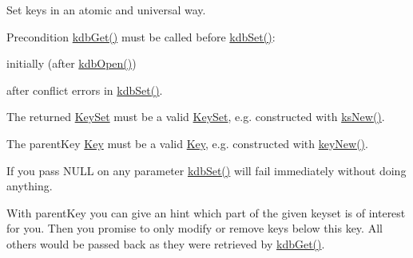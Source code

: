 Set keys in an atomic and universal way. \begin{DoxyPrecond}{Precondition}
\mbox{\hyperlink{group__kdb_ga28e385fd9cb7ccfe0b2f1ed2f62453a1}{kdb\+Get()}} must be called before \mbox{\hyperlink{group__kdb_ga11436b058408f83d303ca5e996832bcf}{kdb\+Set()}}\+:
\begin{DoxyItemize}
\item initially (after \mbox{\hyperlink{group__kdb_ga6808defe5870f328dd17910aacbdc6ca}{kdb\+Open()}})
\item after conflict errors in \mbox{\hyperlink{group__kdb_ga11436b058408f83d303ca5e996832bcf}{kdb\+Set()}}.
\end{DoxyItemize}

The {\ttfamily returned} \mbox{\hyperlink{classkdb_1_1KeySet}{Key\+Set}} must be a valid \mbox{\hyperlink{classkdb_1_1KeySet}{Key\+Set}}, e.\+g. constructed with \mbox{\hyperlink{group__keyset_ga671e1aaee3ae9dc13b4834a4ddbd2c3c}{ks\+New()}}.

The {\ttfamily parent\+Key} \mbox{\hyperlink{classkdb_1_1Key}{Key}} must be a valid \mbox{\hyperlink{classkdb_1_1Key}{Key}}, e.\+g. constructed with \mbox{\hyperlink{group__key_gad23c65b44bf48d773759e1f9a4d43b89}{key\+New()}}.
\end{DoxyPrecond}
If you pass N\+U\+LL on any parameter \mbox{\hyperlink{group__kdb_ga11436b058408f83d303ca5e996832bcf}{kdb\+Set()}} will fail immediately without doing anything.

With {\ttfamily parent\+Key} you can give an hint which part of the given keyset is of interest for you. Then you promise to only modify or remove keys below this key. All others would be passed back as they were retrieved by \mbox{\hyperlink{group__kdb_ga28e385fd9cb7ccfe0b2f1ed2f62453a1}{kdb\+Get()}}.

